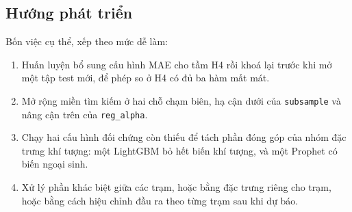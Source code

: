 \documentclass[12pt, a4paper]{report}
\begin{document}
\subsection{Hướng phát triển}

Bốn việc cụ thể, xếp theo mức dễ làm:

\begin{enumerate}
    \item Huấn luyện bổ sung cấu hình MAE cho tầm H4 rồi khoá lại trước khi mở một tập test
    mới, để phép so ở H4 có đủ ba hàm mất mát.
    \item Mở rộng miền tìm kiếm ở hai chỗ chạm biên, hạ cận dưới của \texttt{subsample} và
    nâng cận trên của \texttt{reg\_alpha}.
    \item Chạy hai cấu hình đối chứng còn thiếu để tách phần đóng góp của nhóm đặc trưng khí
    tượng: một LightGBM bỏ hết biến khí tượng, và một Prophet có biến ngoại sinh.
    \item Xử lý phần khác biệt giữa các trạm, hoặc bằng đặc trưng riêng cho trạm, hoặc bằng
    cách hiệu chỉnh đầu ra theo từng trạm sau khi dự báo.
\end{enumerate}


\setcounter{topnumber}{2}
\setcounter{bottomnumber}{1}
\setcounter{totalnumber}{3}
\renewcommand{\topfraction}{0.7}
\renewcommand{\bottomfraction}{0.3}
\renewcommand{\textfraction}{0.2}
\renewcommand{\floatpagefraction}{0.5}

\newpage
\end{document}
